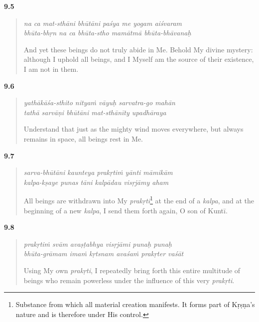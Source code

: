 \par\noindent\textbf{9.5}\par
\begin{verse}
\textit{na ca mat-sthāni bhūtāni paśya me yogam aiśvaram} \\
\textit{bhūta-bhṛn na ca bhūta-stho mamātmā bhūta-bhāvanaḥ}

\noindent And yet these beings do not truly abide in Me. Behold My divine mystery: although I uphold all beings, and I Myself am the source of their existence, I am not in them.
\end{verse}
\par



\par\noindent\textbf{9.6}\par
\begin{verse}
\textit{yathākāśa-sthito nityaṁ vāyuḥ sarvatra-go mahān} \\
\textit{tathā sarvāṇi bhūtāni mat-sthānīty upadhāraya}

\noindent Understand that just as the mighty wind moves everywhere, but always remains in space, all beings rest in Me.
\end{verse}
\par



\par\noindent\textbf{9.7}\par
\begin{verse}
\textit{sarva-bhūtāni kaunteya prakṛtiṁ yānti māmikām} \\
\textit{kalpa-kṣaye punas tāni kalpādau visṛjāmy aham}

\noindent All beings are withdrawn into My \textit{prakṛti}\footnote{Substance from which all material creation manifests. It forms part of Kṛṣṇa's nature and is therefore under His control.} at the end of a \textit{kalpa}, and at the beginning of a new \textit{kalpa}, I send them forth again, O son of Kuntī.
\end{verse}
\par



\par\noindent\textbf{9.8}\par
\begin{verse}
\textit{prakṛtiṁ svām avaṣṭabhya visṛjāmi punaḥ punaḥ} \\
\textit{bhūta-grāmam imaṁ kṛtsnam avaśaṁ prakṛter vaśāt}

\noindent Using My own \textit{prakṛti}, I repeatedly bring forth this entire multitude of beings who remain powerless under the influence of this very \textit{prakṛti}.
\end{verse}
\par



